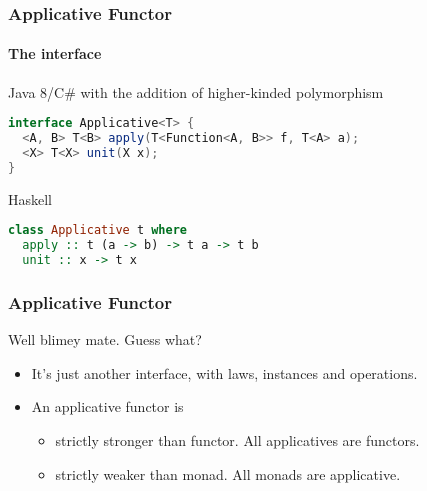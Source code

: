\begin{frame}[fragile]
\frametitle{Applicative Functor}
\framesubtitle{The interface}
\begin{block}{Java 8/C\# with the addition of higher-kinded polymorphism}
\begin{lstlisting}[style=language,language=java]
interface Applicative<T> {
  <A, B> T<B> apply(T<Function<A, B>> f, T<A> a);
  <X> T<X> unit(X x);
}
\end{lstlisting}
\end{block}
\begin{block}{Haskell}
\begin{lstlisting}[style=language,language=haskell]
class Applicative t where
  apply :: t (a -> b) -> t a -> t b
  unit :: x -> t x
\end{lstlisting}
\end{block}
\end{frame}

\begin{frame}[fragile]
\frametitle{Applicative Functor}
\begin{block}{Well blimey mate. Guess what?}
\begin{itemize}
\item It's just another interface, with laws, instances and operations.
\item An applicative functor is
  \begin{itemize}
  \item strictly stronger than functor. All applicatives are functors.
  \item strictly weaker than monad. All monads are applicative.
  \end{itemize}
\end{itemize}
\end{block}
\end{frame}

